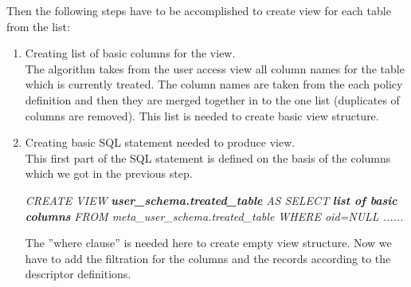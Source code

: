 \begin{flushleft}Then the following steps have to be accomplished to create view for each table from the list:\end{flushleft}

\begin{enumerate}
\item Creating list of basic columns for the view.\\
The algorithm takes from the user access view all column names for the table which is currently treated. The column names are taken from the each policy definition and then they are merged together in to the one list (duplicates of columns are removed). This list is needed to create basic view structure.

\item Creating basic SQL statement needed to produce view.\\
This first part of the SQL statement is defined on the basis of the columns which we got in the previous step. 

\begin{center}\emph{CREATE VIEW} \textbf{\emph{user\_schema.treated\_table}}
\emph{AS SELECT} \textbf{\emph{list of basic columns}}
\emph{FROM meta\_user\_schema.treated\_table WHERE oid=NULL ......}\end{center}
The ''where clause'' is needed here to create empty view structure.
Now we have to add the filtration for the columns and the records according to the descriptor definitions. 



\end{enumerate}
